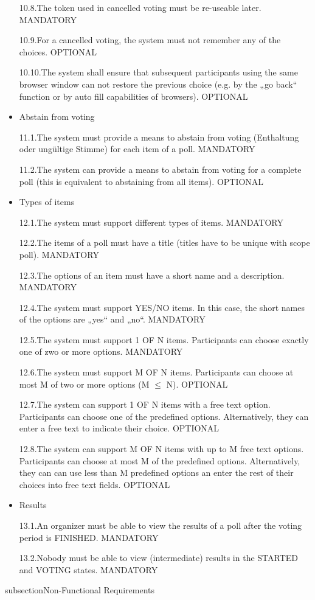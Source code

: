 \begin{itemize}
10.8.The token used in cancelled voting must be re-useable later. MANDATORY


10.9.For a cancelled voting, the system must not remember any of the choices. OPTIONAL


10.10.The system shall ensure that subsequent participants using the same browser window
can not restore the previous choice (e.g. by the „go back“ function or by auto fill capabilities
of browsers). OPTIONAL


\item Abstain from voting


11.1.The system must provide a means to abstain from voting (Enthaltung oder ungültige
Stimme) for each item of a poll. MANDATORY


11.2.The system can provide a means to abstain from voting for a complete poll (this is equivalent
to abstaining from all items). OPTIONAL


\item Types of items


12.1.The system must support different types of items. MANDATORY


12.2.The items of a poll must have a title (titles have to be unique with scope poll). MANDATORY


12.3.The options of an item must have a short name and a description. MANDATORY


12.4.The system must support YES/NO items. In this case, the short names of the options are
„yes“ and „no“. MANDATORY


12.5.The system must support 1 OF N items. Participants can choose exactly one of zwo or
more options. MANDATORY


12.6.The system must support M OF N items. Participants can choose at most M of two or
more options (M $\leq$ N). OPTIONAL


12.7.The system can support 1 OF N items with a free text option. Participants can choose one
of the predefined options. Alternatively, they can enter a free text to indicate their choice.
OPTIONAL


12.8.The system can support M OF N items with up to M free text options. Participants can
choose at most M of the predefined options. Alternatively, they can can use less than M
predefined options an enter the rest of their choices into free text fields. OPTIONAL


\item Results


13.1.An organizer must be able to view the results of a poll after the voting period is FINISHED.
MANDATORY


13.2.Nobody must be able to view (intermediate) results in the STARTED and VOTING states.
MANDATORY

\end{itemize}

subsection{Non-Functional Requirements}
